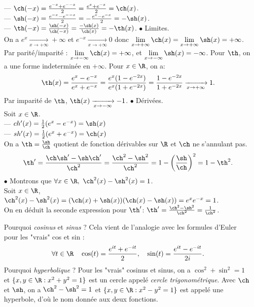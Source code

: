 \documentclass[11pt]{article}
\begin{document}
\begin{prop}{}{}
    --- $\ch(-x)=\frac{e^{-x}+e^{--x}}{2}=\frac{e^x+e^{-x}}{2}=\ch(x)$.\\
    --- $\sh(-x)=\frac{e^{-x}-e^{--x}}{2}=-\frac{e^x-e^{-x}}{2}=-\sh(x)$.\\
    --- $\th(-x)=\frac{\sh(-x)}{\ch(-x)}=\frac{-\sh(x)}{\ch(x)}=-\th(x)$.
    $\bullet$ Limites.\\
    On a $e^x\xrightarrow[x\to+\infty]{}+\infty$ et $e^{-x}\xrightarrow[x\to+\infty]{}0$ donc $\lim\limits_{x\to+\infty}\ch(x)=\lim\limits_{x\to+\infty}\sh(x)=+\infty$.\\
    Par parité/imparité : $\lim\limits_{x\to-\infty}\ch(x)=+\infty$, et $\lim\limits_{x\to-\infty}\sh(x)=-\infty$.\n
    Pour $\th$, on a une forme indeterminée en $+\infty$. Pour $x\in\R$, on a:
    \begin{equation*}
        \th(x)=\frac{e^{x}-e^{-x}}{e^x+e^{-x}}=\frac{e^x(1-e^{-2x})}{e^x(1+e^{-2x})}=\frac{1-e^{-2x}}{1+e^{-2x}}\xrightarrow[x\to+\infty]{}1.
    \end{equation*}
    Par imparité de $\th$, $\th(x)\xrightarrow[x\to-\infty]{}-1$.\n
    $\bullet$ Dérivées.\\
    Soit $x\in\R$.\\
    --- $ch'(x)=\frac{1}{2}(e^x-e^{-x})=\sh(x)$\\
    --- $sh'(x)=\frac{1}{2}(e^x+e^{-x})=\ch(x)$\\
    On a $\th=\frac{\sh}{\ch}$ quotient de fonction dérivables sur $\R$ et $\ch$ ne s'annulant pas.
    \begin{equation*}
        \th'=\frac{\ch\sh'-\sh\ch'}{\ch^2}=\frac{\ch^2-\sh^2}{\ch^2}=1-\left( \frac{\sh}{\ch} \right)^2=1-\th^2.
    \end{equation*}
    $\bullet$ Montrons que $\forall x\in\R,~\ch^2(x)-\sh^2(x)=1$.\\
    Soit $x\in\R$, $\ch^2(x)-\sh^2(x)=(\ch(x)+\sh(x))(\ch(x)-\sh(x))=e^xe^{-x}=1$.\\
    On en déduit la seconde expression pour $\th'$: $\th'=\frac{\ch^2-\sh^2}{\ch^2}=\frac{1}{\ch^2}$.
\end{prop}

Pourquoi \emph{cosinus} et \emph{sinus} ? Cela vient de l'analogie avec les formules d'Euler pour les "vrais" cos et sin :
\begin{equation*}
    \forall t\in\R\quad\cos(t)=\frac{e^{it}+e^{-it}}{2},\quad\sin(t)=\frac{e^{it}-e^{-it}}{2i}.
\end{equation*}
Pourquoi \emph{hyperbolique} ? Pour les "vrais" cosinus et sinus, on a $\cos^2+\sin^2=1$ et $\{x,y\in\R : x^2+y^2=1\}$ est un cercle appelé \emph{cercle trigonométrique}. Avec $\ch$ et $\sh$, on a $\ch^2-\sh^2=1$ et $\{x,y\in\R : x^2-y^2=1\}$ est appelé une hyperbole, d'où le nom donnée aux deux fonctions.
\end{document}

